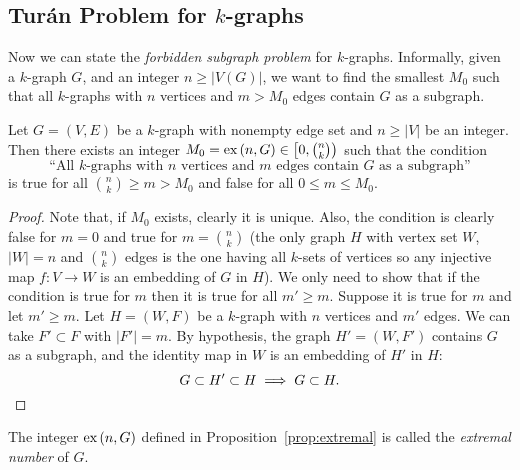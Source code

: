 

\subsection{Turán Problem for $k$-graphs}\label{subsec:turan}

Now we can state the \emph{forbidden subgraph problem} for $k$-graphs.
Informally, given a $k$-graph $G$, and an integer $n \geq |V(G)|$,
we want to find the smallest $M_0$ such that all $k$-graphs with $n$ vertices and $m > M_0$ edges
contain $G$ as a subgraph.

\begin{proposition} \label{prop:extremal}
    Let $G = (V, E)$ be a $k$-graph with nonempty edge set and $n \geq |V|$ be an integer.
    Then there exists an integer $M_0 = \text{ex} \left( n, G \right) \in \left[ 0, \binom{n}{k}\right)$ such that
    the condition
    \[
        \text{``All $k$-graphs with $n$ vertices and $m$ edges contain $G$ as a subgraph''}
    \]
    is true for all $\binom{n}{k} \geq m > M_0$ and false for all $0 \leq m \leq M_0$.

    \begin{proof}
        Note that, if $M_0$ exists, clearly it is unique.
        Also, the condition is clearly false for $m = 0$ and
        true for $m = \binom{n}{k}$
        (the only graph $H$ with vertex set $W$, $|W|=n$ and $\binom{n}{k}$ edges
        is the one having all $k$-sets of vertices so any injective map $f: V \to W$
        is an embedding of $G$ in $H$).
        We only need to show that if the condition is true for $m$ then it is true for
        all $m' \geq m$.
        Suppose it is true for $m$ and let $m' \geq m$.
        Let $H = (W, F)$ be a $k$-graph with $n$ vertices and $m'$ edges.
        We can take $F' \subset F$ with $|F'| = m$.
        By hypothesis, the graph $H' = (W, F')$ contains $G$ as a subgraph,
        and the identity map in $W$ is an embedding of $H'$ in $H$:
        \[
            G \subset H' \subset H \implies G \subset H. \qedhere
        \]
    \end{proof}

\end{proposition}

\begin{definition}
    The integer $\text{ex} \left( n, G \right)$ defined in Proposition~\ref{prop:extremal}
    is called the \emph{extremal number} of $G$.
\end{definition}

